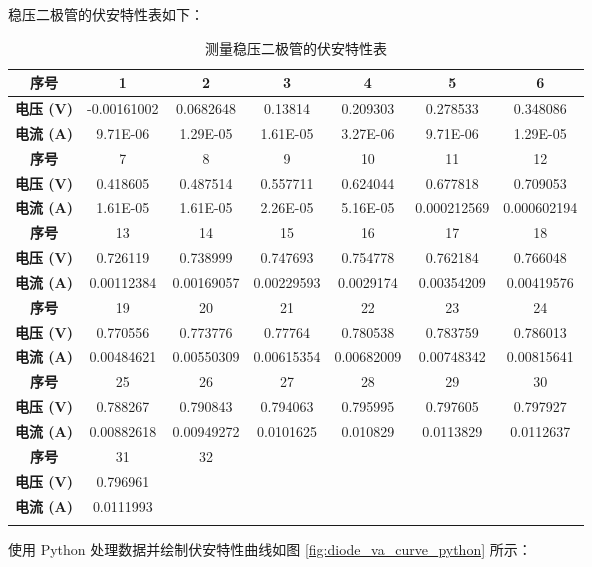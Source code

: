 \documentclass[zihao=5, UTF8]{article}
\theoremstyle{MyLineTheoremStyle} %
\theoremstyle{MyBlockTheoremStyle} %
\theoremstyle{MySubsubsectionStyle} %
\begin{document}
稳压二极管的伏安特性表如下：

\begin{longtable}{|c|c|c|c|c|c|c|}
\hline
\textbf{序号} & 1 & 2 & 3 & 4 & 5 & 6 \\
\hline
\textbf{电压 (V)} & -0.00161002 & 0.0682648  & 0.13814    & 0.209303   & 0.278533   & 0.348086 \\
\hline
\textbf{电流 (A)} & 9.71E-06   & 1.29E-05   & 1.61E-05   & 3.27E-06   & 9.71E-06   & 1.29E-05 \\
\hline
\textbf{序号} & 7 & 8 & 9 & 10 & 11 & 12 \\
\hline
\textbf{电压 (V)} & 0.418605   & 0.487514   & 0.557711   & 0.624044   & 0.677818   & 0.709053 \\
\hline
\textbf{电流 (A)} & 1.61E-05   & 1.61E-05   & 2.26E-05   & 5.16E-05   & 0.000212569 & 0.000602194 \\
\hline
\textbf{序号} & 13 & 14 & 15 & 16 & 17 & 18 \\
\hline
\textbf{电压 (V)} & 0.726119   & 0.738999   & 0.747693   & 0.754778   & 0.762184   & 0.766048 \\
\hline
\textbf{电流 (A)} & 0.00112384 & 0.00169057 & 0.00229593 & 0.0029174  & 0.00354209 & 0.00419576 \\
\hline
\textbf{序号} & 19 & 20 & 21 & 22 & 23 & 24 \\
\hline
\textbf{电压 (V)} & 0.770556   & 0.773776   & 0.77764    & 0.780538   & 0.783759   & 0.786013 \\
\hline
\textbf{电流 (A)} & 0.00484621 & 0.00550309 & 0.00615354 & 0.00682009 & 0.00748342 & 0.00815641 \\
\hline
\textbf{序号} & 25 & 26 & 27 & 28 & 29 & 30 \\
\hline
\textbf{电压 (V)} & 0.788267   & 0.790843   & 0.794063   & 0.795995   & 0.797605   & 0.797927 \\
\hline
\textbf{电流 (A)} & 0.00882618 & 0.00949272 & 0.0101625  & 0.010829   & 0.0113829  & 0.0112637 \\
\hline
\textbf{序号} & 31 & 32 & & & & \\
\hline
\textbf{电压 (V)} & 0.796961   &            &            &            &            & \\
\hline
\textbf{电流 (A)} & 0.0111993  &            &            &            &            & \\
\hline
\caption{测量稳压二极管的伏安特性表}
\end{longtable}

使用 Python 处理数据并绘制伏安特性曲线如图 \ref{fig:diode_va_curve_python} 所示：
\end{document}
